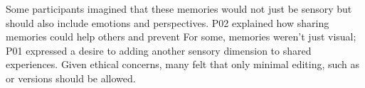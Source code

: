 Some participants imagined that these memories would not just be sensory but should also include emotions and perspectives. P02 explained how sharing memories could help others  and prevent  For some, memories weren't just visual; P01 expressed a desire to  adding another sensory dimension to shared experiences. Given ethical concerns, many felt that only minimal editing, such as  or versions  should be allowed. 


